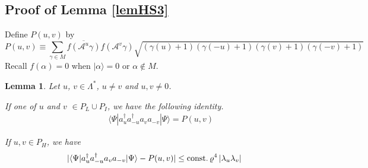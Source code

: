 \documentclass[11pt]{article}
\numberwithin{equation}{section}
\newcommand{\beq}{\begin{equation}}
\newcommand{\eeq}{\end{equation}}
\newcommand{\beqa}{\begin{eqnarray}}
\newcommand{\eeqa}{\end{eqnarray}}
\newcommand\const{{\rm const.\, }}
\newcommand\al{{\alpha}}
\renewcommand\rho\varrho
\newtheorem{lem}{Lemma}[section]
\theoremstyle{definition}
\begin{document}
\subsection{Proof of Lemma \ref{lemHS3}}

Define $P(u,v)$ by
\beq\label{defPuv}P(u,v)\equiv\sum_{\gamma\in M}\overline{f( \mathcal A^u\gamma)}f( \mathcal A^v\gamma)
\sqrt{(\gamma(u)+1)(\gamma(-u)+1)(\gamma(v)+1)(\gamma(-v)+1)}
\eeq
Recall  $f(\al)=0$ when $|\al\rangle=0$ or $\al\notin M$.
\begin{lem}\label{id4a2}
Let $u$, $v\in \Lambda^*$, $u\neq v$ and  $u,v\neq 0$. 
\par If one of $u$ and $v$  $\in P_L\cup P_I$, we have the following identity.
\beqa\label{resultid4a2}
&&\langle\Psi|a_u^\dagger a_{-u}^\dagger a_v  a_{-v}|\Psi\rangle=P(u,v)
\eeqa
\par If $u,v\in P_H$, we have
\beqa\label{resultid4a2o}|\langle\Psi|a_u^\dagger a_{-u}^\dagger a_v  a_{-v}|\Psi\rangle-P(u,v)|\leq \const\rho^4\left|\lambda_u\lambda_v\right|
\eeqa
\end{lem}
\end{document}
